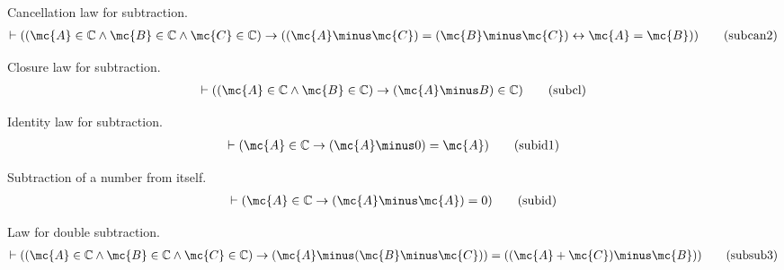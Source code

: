 \begin{lemma} {Cancellation law for subtraction.} 
\begin{align}
\vdash ( ( \mc{A} \in \mathbb{C} \wedge \mc{B} \in \mathbb{C} \wedge \mc{C} \in \mathbb{C} )
    \rightarrow ( ( \mc{A} \minus \mc{C} ) = ( \mc{B} \minus \mc{C} ) \leftrightarrow \mc{A} = \mc{B} )
    )\label{eq:subcan2}\tag{subcan2}
\end{align}
\end{lemma}


\begin{lemma} {Closure law for subtraction.}  
\begin{align}
\vdash ( ( \mc{A} \in \mathbb{C} \wedge \mc{B} \in \mathbb{C} ) \rightarrow ( \mc{A} \minus B
    ) \in \mathbb{C} )\label{eq:subcl}\tag{subcl}
\end{align}
\end{lemma}


\begin{lemma} {Identity law for subtraction.}  
\begin{align}
\vdash ( \mc{A} \in \mathbb{C} \rightarrow ( \mc{A} \minus 0 ) = \mc{A}
    )\label{eq:subid1}\tag{subid1}
\end{align}
\end{lemma}


\begin{lemma} {Subtraction of a number from itself.} 
\begin{align}
\vdash ( \mc{A} \in \mathbb{C} \rightarrow ( \mc{A} \minus \mc{A} ) = 0
    )\label{eq:subid}\tag{subid}
\end{align}
\end{lemma}


\begin{lemma} {Law for double subtraction.}  
\begin{align}
\vdash ( ( \mc{A} \in \mathbb{C} \wedge \mc{B} \in \mathbb{C} \wedge \mc{C} \in
    \mathbb{C} ) \rightarrow ( \mc{A} \minus ( \mc{B} \minus \mc{C} ) ) = ( ( \mc{A} +
    \mc{C} ) \minus \mc{B} ) )\label{eq:subsub3}\tag{subsub3}
\end{align}
\end{lemma}


